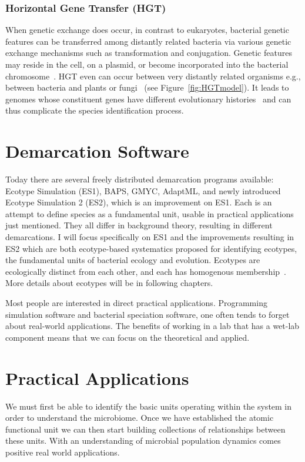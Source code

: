 \subsubsection*{Horizontal Gene Transfer (HGT)}
When genetic exchange does occur, in contrast to eukaryotes, bacterial genetic features can be transferred among distantly related bacteria via various genetic exchange mechanisms such as transformation and conjugation.
Genetic features may reside in the cell, on a plasmid, or become incorporated into the bacterial chromosome~\cite{staley1997biodiversity}.
HGT even can occur between very distantly related organisms e.g., between bacteria and plants or fungi~\cite{gogarten2002prokaryotic} (see Figure~\ref{fig:HGTmodel}).
It leads to genomes whose constituent genes have different evolutionary histories~\cite{gogarten2002prokaryotic} and can thus complicate the species identification process.


\section{Demarcation Software}
Today there are several freely distributed demarcation programs available: Ecotype Simulation (ES1), BAPS, GMYC, AdaptML, and newly introduced Ecotype Simulation 2 (ES2), which is an improvement on ES1.
Each is an attempt to define species as a fundamental unit, usable in practical applications just mentioned.
They all differ in background theory, resulting in different demarcations.
I will focus specifically on ES1 and the improvements resulting in ES2 which are both ecotype-based systematics proposed for identifying ecotypes, the fundamental units of bacterial ecology and evolution.
Ecotypes are ecologically distinct from each other, and each has homogenous membership~\cite{cohan2007systematics}.
More details about ecotypes will be in following chapters.

Most people are interested in direct practical applications.
Programming simulation software and bacterial speciation software, one often tends to forget about real-world applications.
The benefits of working in a lab that has a wet-lab component means that we can focus on the theoretical and applied.

\section{Practical Applications}
We must first be able to identify the basic units operating within the system in order to understand the microbiome.
Once we have established the atomic functional unit we can then start building collections of relationships between these units.
With an understanding of microbial population dynamics comes positive real world applications.

